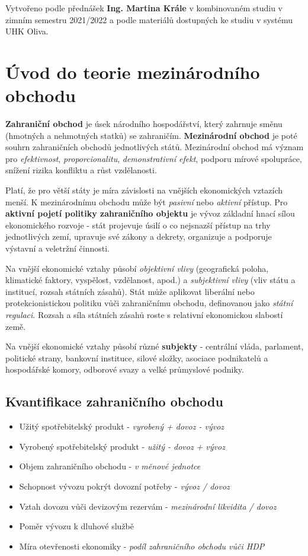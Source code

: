 \epigraph{Vytvořeno podle přednášek \textbf{Ing. Martina Krále} v kombinovaném studiu v zimním semestru 2021/2022 a podle materiálů dostupných ke studiu v systému UHK Oliva.}{}

\section{Úvod do teorie mezinárodního obchodu}

\textbf{Zahraniční obchod} je úsek národního hospodářství, který zahrnuje směnu (hmotných a nehmotných statků) se zahraničím. \textbf{Mezinárodní obchod} je poté souhrn zahraničních obchodů jednotlivých států. Mezinárodní obchod má význam pro \textit{efektivnost}, \textit{proporcionalitu}, \textit{demonstrativní efekt}, podporu mírové spolupráce, snížení rizika konfliktu a růst vzdělanosti.

Platí, že pro větší státy je míra závislosti na vnějších ekonomických vztazích menší. K mezinárodnímu obchodu může být \textit{pasivní} nebo \textit{aktivní} přístup. Pro \textbf{aktivní pojetí politiky zahraničního objektu} je vývoz základní hnací sílou ekonomického rozvoje - stát projevuje úsilí o co nejsnazší přístup na trhy jednotlivých zemí, upravuje své zákony a dekrety, organizuje a podporuje výstavní a veletržní činnosti.

Na vnější ekonomické vztahy působí \textit{objektivní vlivy} (geografická poloha, klimatické faktory, vyspělost, vzdělanost, apod.) a \textit{subjektivní vlivy} (vliv státu a institucí, rozsah státních zásahů). Stát může aplikovat liberální nebo protekcionistickou politiku vůči zahraničnímu obchodu, definovanou jako \textit{státní regulaci}. Rozsah a síla státních zásahů roste s relativní ekonomickou slabostí země.

Na vnější ekonomické vztahy působí různé \textbf{subjekty} - centrální vláda, parlament, politické strany, bankovní instituce, silové složky, asociace podnikatelů a hospodářské komory, odborové svazy a velké průmyslové podniky.

\subsection{Kvantifikace zahraničního obchodu}

\begin{itemize}
    \item Užitý spotřebitelský produkt - \textit{vyrobený + dovoz - vývoz}
    \item Vyrobený spotřebitelský produkt - \textit{užitý - dovoz + vývoz}
    \item Objem zahraničního obchodu - \textit{v měnové jednotce}
    \item Schopnost vývozu pokrýt dovozní potřeby - \textit{vývoz / dovoz}
    \item Vztah dovozu vůči devizovým rezervám - \textit{mezinárodní likvidita / dovoz}
    \item Poměr vývozu k dluhové službě
    \item Míra otevřenosti ekonomiky - \textit{podíl zahraničního obchodu vůči HDP}
\end{itemize}

